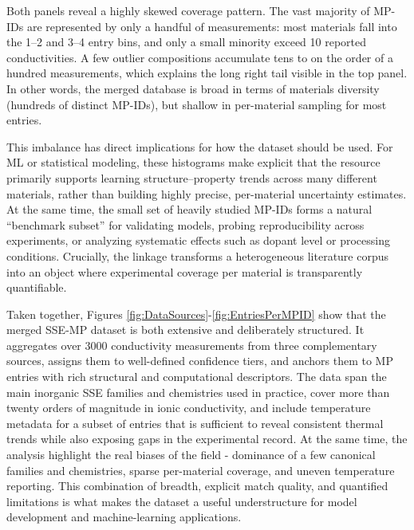 \documentclass[a4paper,fleqn]{cas-sc}
\begin{document}
Both panels reveal a highly skewed coverage pattern. The vast majority of MP-IDs are represented by only a handful of measurements: most materials fall into the 1–2 and 3–4 entry bins, and only a small minority exceed 10 reported conductivities. A few outlier compositions accumulate tens to on the order of a hundred measurements, which explains the long right tail visible in the top panel. In other words, the merged database is broad in terms of materials diversity (hundreds of distinct MP-IDs), but shallow in per-material sampling for most entries.

This imbalance has direct implications for how the dataset should be used. For ML or statistical modeling, these histograms make explicit that the resource primarily supports learning structure–property trends across many different materials, rather than building highly precise, per-material uncertainty estimates. At the same time, the small set of heavily studied MP-IDs forms a natural “benchmark subset” for validating models, probing reproducibility across experiments, or analyzing systematic effects such as dopant level or processing conditions. Crucially, the linkage transforms a heterogeneous literature corpus into an object where experimental coverage per material is transparently quantifiable.

Taken together, Figures \ref{fig:DataSources}-\ref{fig:EntriesPerMPID} show that the merged SSE-MP dataset is both extensive and deliberately structured. It aggregates over 3000 conductivity measurements from three complementary sources, assigns them to well-defined confidence tiers, and anchors them to MP entries with rich structural and computational descriptors. The data span the main inorganic SSE families and chemistries used in practice, cover more than twenty orders of magnitude in ionic conductivity, and include temperature metadata for a subset of entries that is sufficient to reveal consistent thermal trends while also exposing gaps in the experimental record. At the same time, the analysis highlight the real biases of the field - dominance of a few canonical families and chemistries, sparse per-material coverage, and uneven temperature reporting. This combination of breadth, explicit match quality, and quantified limitations is what makes the dataset a useful understructure for model development and machine-learning applications.
\end{document}

